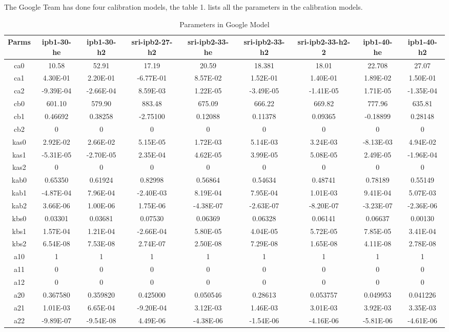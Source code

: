 \documentclass{article}
\begin{document}
The Google Team has done four calibration models, the table 1. lists all the parameters in the calibration models.
\begin{landscape}
\begin{table}[h]
\centering
\caption{Parameters in Google Model}

\begin{tabular}{|c|c|c|c|c|c|c|c|c|}
\hline
Parms	&	ipb1-30-he	&	ipb1-30-h2	&	sri-ipb2-27-h2	&	sri-ipb2-33-he	&	sri-ipb2-33-h2	&	sri-ipb2-33-h2-2	&	ipb1-40-he	&	ipb1-40-h2	\\	\hline
ca0	&	10.58	&	52.91	&	17.19	&	20.59	&	18.381	&	18.01	&	22.708	&	27.07	\\	\hline
ca1	&	4.30E-01	&	2.20E-01	&	-6.77E-01	&	8.57E-02	&	1.52E-01	&	1.40E-01	&	1.89E-02	&	1.50E-01	\\	\hline
ca2	&	-9.39E-04	&	-2.66E-04	&	8.59E-03	&	1.22E-05	&	-3.49E-05	&	-1.41E-05	&	1.71E-05	&	-1.35E-04	\\	\hline
cb0	&	601.10	&	579.90	&	883.48	&	675.09	&	666.22	&	669.82	&	777.96	&	635.81	\\	\hline
cb1	&	0.46692	&	0.38258	&	-2.75100	&	0.12088	&	0.11378	&	0.09365	&	-0.18899	&	0.28148	\\	\hline
cb2	&	0	&	0	&	0	&	0	&	0	&	0	&	0	&	0	\\	\hline
kas0	&	2.92E-02	&	2.66E-02	&	5.15E-05	&	1.72E-03	&	5.14E-03	&	3.24E-03	&	-8.13E-03	&	4.94E-02	\\	\hline
kas1	&	-5.31E-05	&	-2.70E-05	&	2.35E-04	&	4.62E-05	&	3.99E-05	&	5.08E-05	&	2.49E-05	&	-1.96E-04	\\	\hline
kas2	&	0	&	0	&	0	&	0	&	0	&	0	&	0	&	0	\\	\hline
kab0	&	0.65350	&	0.61924	&	0.82998	&	0.56864	&	0.54634	&	0.48741	&	0.78189	&	0.55149	\\	\hline
kab1	&	-4.87E-04	&	7.96E-04	&	-2.40E-03	&	8.19E-04	&	7.95E-04	&	1.01E-03	&	9.41E-04	&	5.07E-03	\\	\hline
kab2	&	3.66E-06	&	1.00E-06	&	1.75E-06	&	-4.38E-07	&	-2.63E-07	&	-8.20E-07	&	-3.23E-07	&	-2.36E-06	\\	\hline
kbs0	&	0.03301	&	0.03681	&	0.07530	&	0.06369	&	0.06328	&	0.06141	&	0.06637	&	0.00130	\\	\hline
kbs1	&	1.57E-04	&	1.21E-04	&	-2.66E-04	&	5.80E-05	&	4.04E-05	&	5.72E-05	&	7.85E-05	&	3.41E-04	\\	\hline
kbs2	&	6.54E-08	&	7.53E-08	&	2.74E-07	&	2.50E-08	&	7.29E-08	&	1.65E-08	&	4.11E-08	&	2.78E-08	\\	\hline
a10	&	1	&	1	&	1	&	1	&	1	&	1	&	1	&	1	\\	\hline
a11	&	0	&	0	&	0	&	0	&	0	&	0	&	0	&	0	\\	\hline
a12	&	0	&	0	&	0	&	0	&	0	&	0	&	0	&	0	\\	\hline
a20	&	0.367580	&	0.359820	&	0.425000	&	0.050546	&	0.28613	&	0.053757	&	0.049953	&	0.041226	\\	\hline
a21	&	1.01E-03	&	6.65E-04	&	-9.20E-04	&	3.12E-03	&	1.46E-03	&	3.01E-03	&	3.92E-03	&	3.35E-03	\\	\hline
a22	&	-9.89E-07	&	-9.54E-08	&	4.49E-06	&	-4.38E-06	&	-1.54E-06	&	-4.16E-06	&	-5.81E-06	&	-4.61E-06	\\	\hline


\end{tabular}
\end{table}
\end{landscape}
\end{document}
